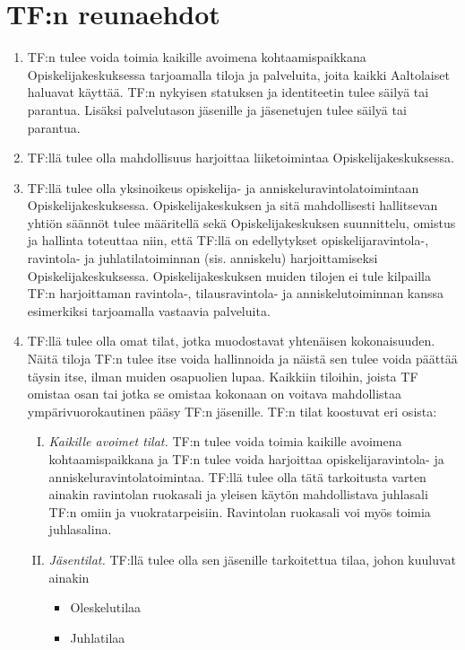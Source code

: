 \documentclass[a4paper, 12pt, finnish]{report}
\begin{document}
\section*{TF:n reunaehdot}
\begin{enumerate}
    \item{TF:n tulee voida toimia kaikille avoimena kohtaamispaikkana Opiskelijakeskuksessa tarjoamalla tiloja ja palveluita, joita kaikki Aaltolaiset haluavat käyttää. TF:n nykyisen statuksen ja identiteetin tulee säilyä tai parantua. Lisäksi palvelutason jäsenille ja jäsenetujen tulee säilyä tai parantua.}
    \item{TF:llä tulee olla mahdollisuus harjoittaa liiketoimintaa Opiskelijakeskuksessa.}
    \item{TF:llä tulee olla yksinoikeus opiskelija- ja anniskeluravintolatoimintaan Opiskelijakeskuksessa. Opiskelijakeskuksen ja sitä mahdollisesti hallitsevan yhtiön säännöt tulee määritellä sekä Opiskelijakeskuksen suunnittelu, omistus ja hallinta toteuttaa niin, että TF:llä on edellytykset opiskelijaravintola-, ravintola- ja juhlatilatoiminnan (sis. anniskelu) harjoittamiseksi Opiskelijakeskuksessa. Opiskelijakeskuksen muiden tilojen ei tule kilpailla TF:n harjoittaman ravintola-, tilausravintola- ja anniskelutoiminnan kanssa esimerkiksi tarjoamalla vastaavia palveluita.}
    \item{TF:llä tulee olla omat tilat, jotka muodostavat yhtenäisen kokonaisuuden. Näitä tiloja TF:n tulee itse voida hallinnoida ja näistä sen tulee voida päättää täysin itse, ilman muiden osapuolien lupaa. Kaikkiin tiloihin, joista TF omistaa osan tai jotka se omistaa kokonaan on voitava mahdollistaa ympärivuorokautinen pääsy TF:n jäsenille. TF:n tilat koostuvat eri osista:}
        \begin{enumerate}[I.]
            \item{\textit{Kaikille avoimet tilat.} TF:n tulee voida toimia kaikille avoimena kohtaamispaikkana ja TF:n tulee voida harjoittaa opiskelijaravintola- ja anniskeluravintolatoimintaa. TF:llä tulee olla tätä tarkoitusta varten ainakin ravintolan ruokasali ja yleisen käytön mahdollistava juhlasali TF:n omiin ja vuokratarpeisiin. Ravintolan ruokasali voi myös toimia juhlasalina.}
            \item{\textit{Jäsentilat.} TF:llä tulee olla sen jäsenille tarkoitettua tilaa, johon kuuluvat ainakin}
                \begin{itemize}
                    \item{Oleskelutilaa}
                    \item{Juhlatilaa}

\end{itemize}
\end{enumerate}
\end{enumerate}
\end{document}
